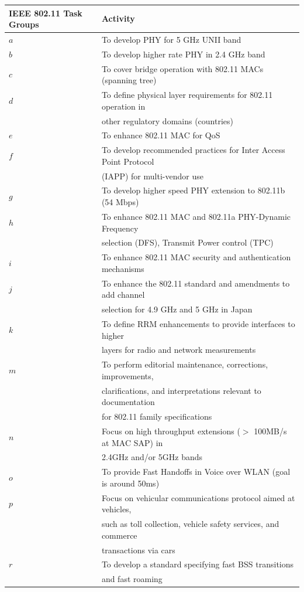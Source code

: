 \documentclass[journal,transmag]{IEEEtran}
\begin{document}
\begin{center} 
\begin{table}[htbp]
\centering
\begin{tabular}{|p{}|p{}|}
\hline
IEEE 802.11 Task Groups 		& Activity \\
\hline
$a$				& To develop PHY for 5 GHz UNII band\\
$b$				& To develop higher rate PHY in 2.4 GHz band \\
$c$				& To cover bridge operation with 802.11 MACs (spanning tree) \\
$d$				& To define physical layer requirements for 802.11 operation in \\
				& other regulatory domains (countries)\\
$e$ 				& To enhance 802.11 MAC for QoS\\
$f$		        & To develop recommended practices for Inter Access Point Protocol \\
				& (IAPP) for multi-vendor use\\
$g$				& To develop higher speed PHY extension to 802.11b (54 Mbps) \\
$h$				& To enhance 802.11 MAC and 802.11a PHY-Dynamic Frequency \\
				& selection (DFS), Transmit Power control (TPC)\\
$i$				& To enhance 802.11 MAC security and authentication mechanisms\\
$j$				& To enhance the 802.11 standard and amendments to add channel \\
				& selection for 4.9 GHz and 5 GHz in Japan \\
$k$				& To define RRM enhancements to provide interfaces to higher \\
				& layers for radio and network measurements\\
$m$				& To perform editorial maintenance, corrections, improvements, \\
				& clarifications, and interpretations relevant to documentation \\
				& for 802.11 family specifications \\
$n$				& Focus on high throughput extensions ($>$ 100MB/s at MAC SAP) in \\
				& 2.4GHz and/or 5GHz bands \\
$o$				& To provide Fast Handoffs in Voice over WLAN (goal is around 50ms)\\			
$p$ 				& Focus on vehicular communications protocol aimed at vehicles, \\
				& such as toll collection, vehicle safety services, and commerce \\
				& transactions via cars \\
$r$				& To develop a standard specifying fast BSS transitions \\
				& and fast roaming\\
				

\end{tabular}
\end{table}
\end{center}
\end{document}
